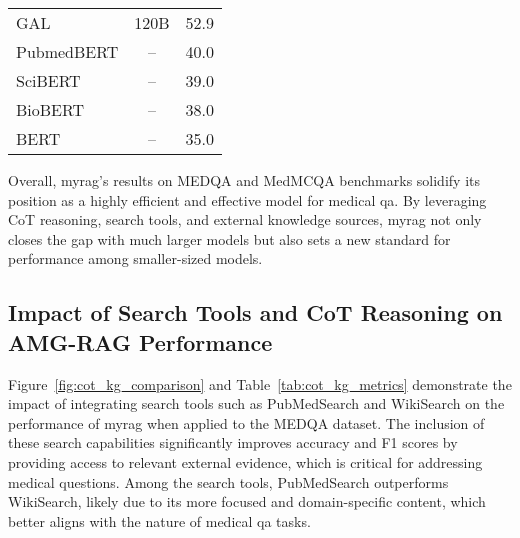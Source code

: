 \begin{table}[h!]
\begin{tabular}{@{}lcc@{}}
GAL                        & 120B                         & 52.9 \\
PubmedBERT \citep{gu2021domain}                & --                           & 40.0 \\
SciBERT \citep{pal2022medmcqa}              & --                           & 39.0 \\
BioBERT \citep{lee2020biobert}                  & --                           & 38.0 \\
BERT \citep{devlin2018bert}                  & --                           & 35.0 \\
\bottomrule
\end{tabular}%

\end{table}


Overall, \gls{myrag}'s results on MEDQA and MedMCQA benchmarks solidify its position as a highly efficient and effective model for medical \gls{qa}. By leveraging CoT reasoning, search tools, and external knowledge sources, \gls{myrag} not only closes the gap with much larger models but also sets a new standard for performance among smaller-sized models.
\subsection{Impact of Search Tools and CoT Reasoning on AMG-RAG Performance}

Figure~\ref{fig:cot_kg_comparison} and Table~\ref{tab:cot_kg_metrics} demonstrate the impact of integrating search tools such as PubMedSearch and WikiSearch on the performance of \gls{myrag} when applied to the MEDQA dataset. The inclusion of these search capabilities significantly improves accuracy and F1 scores by providing access to relevant external evidence, which is critical for addressing medical questions. Among the search tools, PubMedSearch outperforms WikiSearch, likely due to its more focused and domain-specific content, which better aligns with the nature of medical \gls{qa} tasks.


